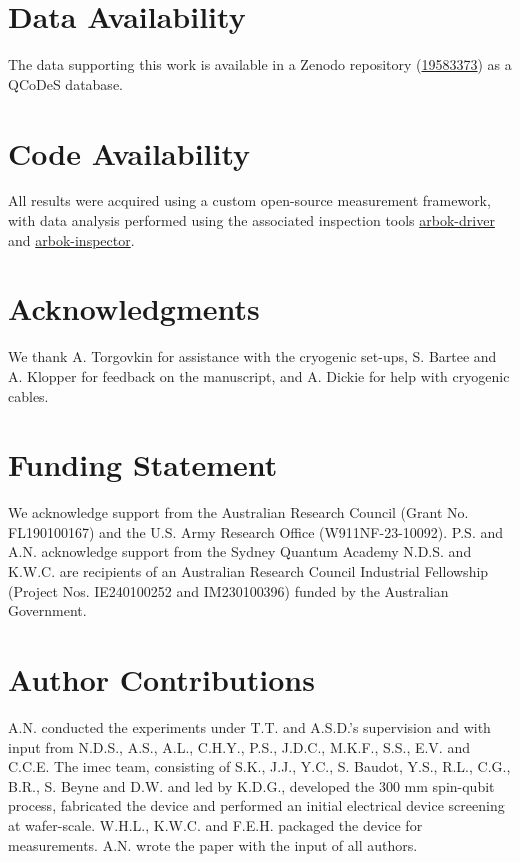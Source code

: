 \documentclass[superscriptaddress,twocolumn,10pt,prl,floatfix,nofootinbib,aps]{revtex4-2}
\newif\ifpreprint
\begin{document}
\section{Data Availability}
\noindent
The data supporting this work is available in a Zenodo repository (\href{https://zenodo.org/records/19583373}{19583373}) as a QCoDeS database.

\section{Code Availability}
\noindent
All results were acquired using a custom open-source measurement framework, with data analysis performed using the associated inspection tools \href{https://github.com/andncl/arbok_driver}{arbok-driver} and \href{https://github.com/andncl/arbok_inspector}{arbok-inspector}.

\ifpreprint

\else

\fi

\section*{Acknowledgments}
\noindent 
We thank A. Torgovkin for assistance with the cryogenic set-ups, S. Bartee and A. Klopper for feedback on the manuscript, and A. Dickie for help with cryogenic cables.

\section{Funding Statement}
\noindent
We acknowledge support from
the Australian Research Council (Grant No. FL190100167) and the U.S. Army Research Office
(W911NF-23-10092). P.S. and A.N. acknowledge support from the Sydney Quantum Academy
N.D.S. and K.W.C. are
recipients of an Australian Research Council Industrial Fellowship (Project Nos. IE240100252
and IM230100396) funded by the Australian Government.


\section{Author Contributions}
\noindent 
A.N. conducted the experiments under T.T. and A.S.D.’s supervision and with input from N.D.S., A.S., A.L., C.H.Y., P.S., J.D.C., M.K.F., S.S., E.V. and C.C.E.
The imec team, consisting of S.K., J.J., Y.C., S. Baudot, Y.S., R.L., C.G., B.R., S. Beyne and D.W. and led by K.D.G., developed the 300 mm spin-qubit process, fabricated the device and performed an initial electrical device screening at wafer-scale. W.H.L., K.W.C. and F.E.H. packaged the device for measurements.
A.N. wrote the paper with the input of all authors.
\end{document}
